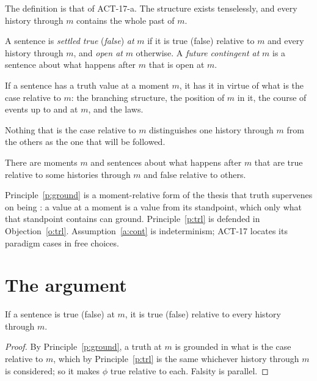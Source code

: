 \documentclass{situationist-preprint}
\begin{document}
The definition is that of ACT-17-a. The structure exists tenselessly, and every history through $m$ contains the whole past of $m$.

\begin{definition}[Settledness]\label{d:settled}
A sentence is \emph{settled true} (\emph{false}) \emph{at} $m$ if it is true (false) relative to $m$ and every history through $m$, and \emph{open at} $m$ otherwise. A \emph{future contingent at} $m$ is a sentence about what happens after $m$ that is open at $m$.
\end{definition}

\begin{principle}\label{p:ground}
If a sentence has a truth value at a moment $m$, it has it in virtue of what is the case relative to $m$: the branching structure, the position of $m$ in it, the course of events up to and at $m$, and the laws.
\end{principle}

\begin{principle}\label{p:trl}
Nothing that is the case relative to $m$ distinguishes one history through $m$ from the others as the one that will be followed.
\end{principle}

\begin{assumption}[Contingency]\label{a:cont}
There are moments $m$ and sentences about what happens after $m$ that are true relative to some histories through $m$ and false relative to others.
\end{assumption}

Principle~\ref{p:ground} is a moment-relative form of the thesis that truth supervenes on being \citep{Bigelow1988}: a value at a moment is a value from its standpoint, which only what that standpoint contains can ground. Principle~\ref{p:trl} is defended in Objection~\ref{o:trl}. Assumption~\ref{a:cont} is indeterminism; ACT-17 locates its paradigm cases in free choices.

\section{The argument}

\begin{lemma}\label{l:true}
If a sentence is true (false) at $m$, it is true (false) relative to every history through $m$.
\end{lemma}

\begin{proof}
By Principle~\ref{p:ground}, a truth at $m$ is grounded in what is the case relative to $m$, which by Principle~\ref{p:trl} is the same whichever history through $m$ is considered; so it makes $\phi$ true relative to each. Falsity is parallel.
\end{proof}
\end{document}

